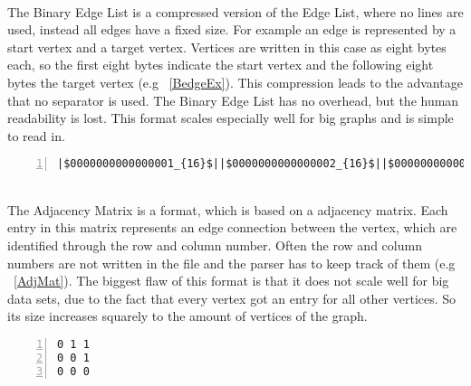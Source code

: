 \\
The Binary Edge List is a compressed version of the Edge List, where no lines are used, instead all edges have a fixed size. For example an edge is represented by a start vertex and a target vertex. Vertices are written in this case as eight bytes each, so the first eight bytes indicate the start vertex and the following eight bytes the target vertex (e.g ~\ref{BedgeEx}). This compression leads to the advantage that no separator is used. The Binary Edge List has no overhead, but the human readability is lost. This format scales especially well for big graphs and is simple to read in.
\vspace{-7mm}
\begin{center}
	\begin{minipage}{.6\textwidth}
\begin{lstlisting}[numbers=left,firstnumber=1,caption={Binary Edge List in Hex View},captionpos=b, linewidth={\textwidth}, escapeinside=||, breakindent=0pt,	
breaklines=true,label={BedgeEx}]
|$0000000000000001_{16}$||$0000000000000002_{16}$||$0000000000000001_{16}$| |$0000000000000003_{16}$||$0000000000000002_{16}$||$0000000000000003_{16}$| ...|$v_{1}v_{2}v_{1}v_{3}v_{2}v_{3}$|
\end{lstlisting}
\end{minipage}
\end{center}
\newpage
{}\\
The Adjacency Matrix is a format, which is based on a adjacency matrix. Each entry in this matrix represents an edge connection between the vertex, which are identified through the row and column number. Often the row and column numbers are not written in the file and the parser has to keep track of them (e.g ~\ref{AdjMat}). The biggest flaw of this format is that it does not scale well for big data sets, due to the fact that every vertex got an entry for all other vertices. So its size increases squarely to the amount of vertices of the graph.
\vspace{-7mm}
\begin{center}
	\begin{minipage}{.6\textwidth}
\begin{lstlisting}[numbers=left,
    stepnumber=1,caption={Adjacency Matrix},captionpos=b, linewidth={\textwidth}, escapeinside=||,label={AdjMat}]
0 1 1
0 0 1
0 0 0
\end{lstlisting}
\end{minipage}
\end{center}

